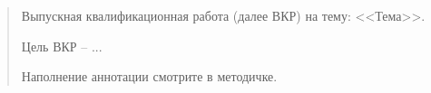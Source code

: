 \begin{abstract}
\thispagestyle{empty}

Выпускная квалификационная работа (далее ВКР) на тему: <<Тема>>.

Цель ВКР – ...

Наполнение аннотации смотрите в методичке.
\end{abstract}